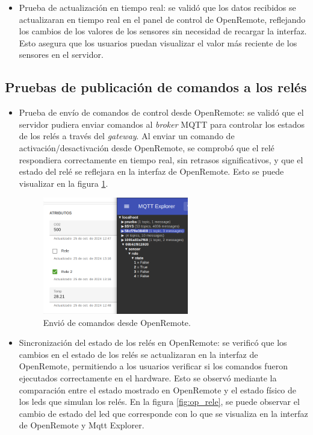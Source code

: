 \begin{itemize}
    
    \item Prueba de actualización en tiempo real: se validó que los datos recibidos se actualizaran en tiempo real en el panel de control de OpenRemote, reflejando los cambios de los valores de los sensores sin necesidad de recargar la interfaz. Esto asegura que los usuarios puedan visualizar el valor más reciente de los sensores en el servidor.
    
\end{itemize}

\subsection{Pruebas de publicación de comandos a los relés}

\begin{itemize}
    \item Prueba de envío de comandos de control desde OpenRemote: se validó que el servidor pudiera enviar comandos al \textit{broker} MQTT para controlar los estados de los relés a través del \textit{gateway}. Al enviar un comando de activación/desactivación desde OpenRemote, se comprobó que el relé respondiera correctamente en tiempo real, sin retrasos significativos, y que el estado del relé se reflejara en la interfaz de OpenRemote. Esto se puede visualizar en la figura \ref{fig:op_reles}.
    
\begin{figure}[H]
\centering 
\includegraphics[width=0.6\textwidth]{./Figures/op_reles.png}
\caption{Envió de comandos desde OpenRemote.}
\label{fig:op_reles}
\end{figure}   
    
    \item Sincronización del estado de los relés en OpenRemote: se verificó que los cambios en el estado de los relés se actualizaran en la interfaz de OpenRemote, permitiendo a los usuarios verificar si los comandos fueron ejecutados correctamente en el hardware. Esto se observó mediante la comparación entre el estado mostrado en OpenRemote y el estado físico de los leds que simulan los relés. En la figura \ref{fig:op_rele}, se puede observar el cambio de estado del led que corresponde con lo que se visualiza en la interfaz de OpenRemote y Mqtt Explorer.
    

\end{itemize}
